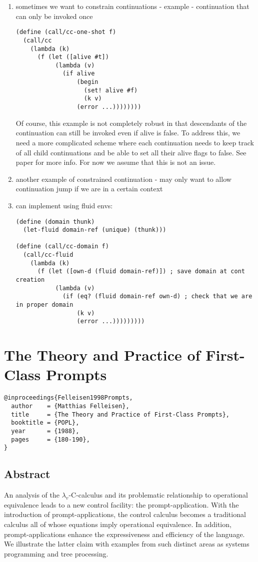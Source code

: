 \documentclass[letterpaper]{llncs}
\begin{document}
\begin{enumerate}
	\item sometimes we want to constrain continuations - example - continuation that can only be invoked once
\begin{verbatim}
(define (call/cc-one-shot f)
  (call/cc
    (lambda (k)
      (f (let ([alive #t])
           (lambda (v)
             (if alive
                 (begin
                   (set! alive #f)
                   (k v)
                 (error ...))))))))
\end{verbatim}
Of course, this example is not completely robust in that descendants of the continuation can still be invoked even if alive is false. To address this, we need a more complicated scheme where each continuation needs to keep track of all child continuations and be able to set all their alive flags to false. See paper for more info. For now we assume that this is not an issue.
	\item another example of constrained continuation - may only want to allow continuation jump if we are in a certain context
	\item can implement using fluid envs:
\begin{verbatim}
(define (domain thunk)
  (let-fluid domain-ref (unique) (thunk)))
  
(define (call/cc-domain f)
  (call/cc-fluid
    (lambda (k)
      (f (let ([own-d (fluid domain-ref)]) ; save domain at cont creation
           (lambda (v)
             (if (eq? (fluid domain-ref own-d) ; check that we are in proper domain
                 (k v)
                 (error ...)))))))))
\end{verbatim}
\end{enumerate}


\section*{The Theory and Practice of First-Class Prompts}%

\begin{verbatim}
@inproceedings{Felleisen1998Prompts,
  author    = {Matthias Felleisen},
  title     = {The Theory and Practice of First-Class Prompts},
  booktitle = {POPL},
  year      = {1988},
  pages     = {180-190},
}
\end{verbatim}

\subsection*{Abstract}
An analysis of the $\lambda_v$-C-calculus and its problematic relationship to operational equivalence leads to a new control facility: the prompt-application. With the introduction of prompt-applications, the control calculus becomes a traditional calculus all of whose equations imply operational equivalence. In addition, prompt-applications enhance the expressiveness and efficiency of the language. We illustrate the latter claim with examples from such distinct areas as systems programming and tree processing.
\end{document}
